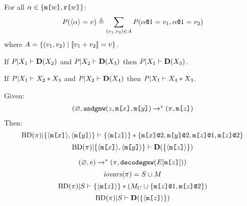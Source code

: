 \begin{definition}
  For all $\alpha \in \{ \mesg{w}, \flip{w} \}$:
  $$\pmf(\macgv{\alpha} = v) \defeq \sum_{(v_1,v_2) \in A} \pmf(\elab{\alpha}{1} = v_1, \elab{\alpha}{1} = v_2)$$
  where $A = \{ (v_1,v_2) \mid \cod{v_1 + v_2} = v \}$.
\end{definition}

\begin{lemma}
  If $\condp{\pmf}{X_1}{\detx{X_2}}$ and
  $\condp{\pmf}{X_2}{\detx{X_3}}$ then $\condp{\pmf}{X_1}{\detx{X_3}}$.
\end{lemma}

\begin{lemma}
  If $\condsep{\pmf}{X_1}{X_2}{X_3}$ and
  $\condp{\pmf}{X_2}{\detx{X_4}}$ then $\condsep{\pmf}{X_1}{X_4}{X_3}$.
\end{lemma}

\begin{lemma}
  Given:
  $$
  \begin{array}{c}
  (\varnothing,\andgmw(z,\mesg{x},\mesg{y}) \redxs %
  (\prog,\mesg{z})
  \end{array}
  $$
  Then:
  $$
  \condsep
      {\progtt(\prog)}
      {\{ \macgv{\mesg{x}},\macgv{\mesg{y}} \}}
      {\{ \macgv{\mesg{z}} \}}
      {\{ \elab{\mesg{x}}{2},\elab{\mesg{y}}{2},\elab{\mesg{z}}{1},\elab{\mesg{z}}{2} \}}
  $$
  $$
  \conddetx{\progtt(\prog)}{\{ \macgv{\mesg{x}},\macgv{\mesg{y}} \}}{\{ \macgv{\mesg{z}} \}}    
  $$
\end{lemma}

\begin{lemma}
  $$ (\varnothing,e) \redxs (\prog,\decodegmw(E[\mesg{z}])) $$
  $$\iov(\prog) = S \cup M$$
  $$\condsep{\progtt(\prog)}{S}{\{\macgv{\mesg{z}}\}}{(M_C \cup \{ \elab{\mesg{z}}{1}, \elab{\mesg{z}}{2} \})}$$
  $$\conddetx{\progtt(\prog)}{S}{\{\macgv{\mesg{z}}\}}$$
\end{lemma}

\begin{mathpar}
  
  
\end{mathpar}

